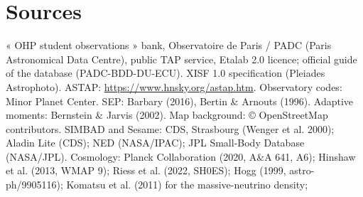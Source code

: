 \section*{Sources}
« OHP student observations » bank, Observatoire de Paris / PADC (Paris Astronomical Data Centre), public TAP
service, Etalab 2.0 licence; official guide of the database (PADC-BDD-DU-ECU). XISF 1.0 specification (Pleiades
Astrophoto). ASTAP: \url{https://www.hnsky.org/astap.htm}. Observatory codes: Minor Planet Center. SEP: Barbary
(2016), Bertin \& Arnouts (1996). Adaptive moments: Bernstein \& Jarvis (2002). Map background: © OpenStreetMap
contributors. SIMBAD and Sesame: CDS, Strasbourg (Wenger et al. 2000); Aladin Lite (CDS); NED (NASA/IPAC); JPL
Small-Body Database (NASA/JPL). Cosmology: Planck Collaboration (2020, A\&A 641, A6); Hinshaw et al. (2013, WMAP 9);
Riess et al. (2022, SH0ES); Hogg (1999, astro-ph/9905116); Komatsu et al. (2011) for the massive-neutrino density;
